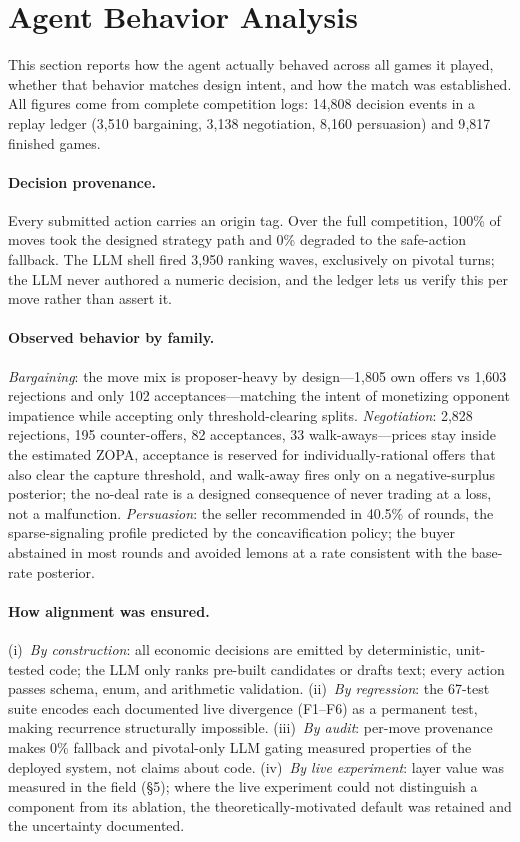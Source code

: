 \documentclass{article}
\begin{document}
\section{Agent Behavior Analysis}
\label{sec:behavior}
This section reports how the agent actually behaved across all games it played, whether that behavior matches design intent, and how the match was established. All figures come from complete competition logs: 14{,}808 decision events in a replay ledger (3{,}510 bargaining, 3{,}138 negotiation, 8{,}160 persuasion) and 9{,}817 finished games.

\paragraph{Decision provenance.} Every submitted action carries an origin tag. Over the full competition, 100\% of moves took the designed strategy path and 0\% degraded to the safe-action fallback. The LLM shell fired 3{,}950 ranking waves, exclusively on pivotal turns; the LLM never authored a numeric decision, and the ledger lets us verify this per move rather than assert it.

\paragraph{Observed behavior by family.} \emph{Bargaining}: the move mix is proposer-heavy by design---1{,}805 own offers vs 1{,}603 rejections and only 102 acceptances---matching the intent of monetizing opponent impatience while accepting only threshold-clearing splits. \emph{Negotiation}: 2{,}828 rejections, 195 counter-offers, 82 acceptances, 33 walk-aways---prices stay inside the estimated ZOPA, acceptance is reserved for individually-rational offers that also clear the capture threshold, and walk-away fires only on a negative-surplus posterior; the no-deal rate is a designed consequence of never trading at a loss, not a malfunction. \emph{Persuasion}: the seller recommended in 40.5\% of rounds, the sparse-signaling profile predicted by the concavification policy; the buyer abstained in most rounds and avoided lemons at a rate consistent with the base-rate posterior.

\paragraph{How alignment was ensured.} (i)~\emph{By construction}: all economic decisions are emitted by deterministic, unit-tested code; the LLM only ranks pre-built candidates or drafts text; every action passes schema, enum, and arithmetic validation. (ii)~\emph{By regression}: the 67-test suite encodes each documented live divergence (F1--F6) as a permanent test, making recurrence structurally impossible. (iii)~\emph{By audit}: per-move provenance makes 0\% fallback and pivotal-only LLM gating measured properties of the deployed system, not claims about code. (iv)~\emph{By live experiment}: layer value was measured in the field (\S5); where the live experiment could not distinguish a component from its ablation, the theoretically-motivated default was retained and the uncertainty documented.
\end{document}
